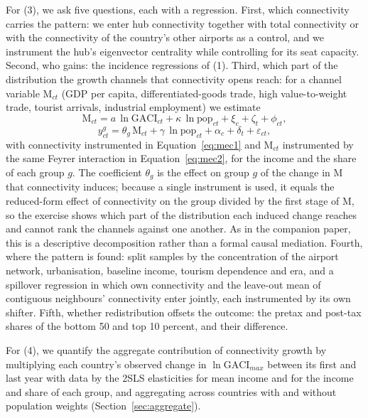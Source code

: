 For (3), we ask five questions, each with a regression. First, which connectivity carries the pattern: we enter hub connectivity together with total connectivity or with the connectivity of the country's other airports as a control, and we instrument the hub's eigenvector centrality while controlling for its seat capacity. Second, who gains: the incidence regressions of (1). Third, which part of the distribution the growth channels that connectivity opens reach: for a channel variable $\mathrm{M}_{ct}$ (GDP per capita, differentiated-goods trade, high value-to-weight trade, tourist arrivals, industrial employment) we estimate
\begin{equation}
\mathrm{M}_{ct} = a\,\ln\mathrm{GACI}_{ct} + \kappa\,\ln\text{pop}_{ct} + \xi_c + \zeta_t + \phi_{ct},
\label{eq:mec1}
\end{equation}
\begin{equation}
y^{g}_{ct} = \theta_g\,\mathrm{M}_{ct} + \gamma\,\ln\text{pop}_{ct} + \alpha_c + \delta_t + \varepsilon_{ct},
\label{eq:mec2}
\end{equation}
with connectivity instrumented in Equation~\eqref{eq:mec1} and $\mathrm{M}_{ct}$ instrumented by the same Feyrer interaction in Equation~\eqref{eq:mec2}, for the income and the share of each group $g$. The coefficient $\theta_g$ is the effect on group $g$ of the change in $\mathrm{M}$ that connectivity induces; because a single instrument is used, it equals the reduced-form effect of connectivity on the group divided by the first stage of $\mathrm{M}$, so the exercise shows which part of the distribution each induced change reaches and cannot rank the channels against one another. As in the companion paper, this is a descriptive decomposition rather than a formal causal mediation. Fourth, where the pattern is found: split samples by the concentration of the airport network, urbanisation, baseline income, tourism dependence and era, and a spillover regression in which own connectivity and the leave-out mean of contiguous neighbours' connectivity enter jointly, each instrumented by its own shifter. Fifth, whether redistribution offsets the outcome: the pretax and post-tax shares of the bottom 50 and top 10 percent, and their difference.

For (4), we quantify the aggregate contribution of connectivity growth by multiplying each country's observed change in $\ln\mathrm{GACI}_{max}$ between its first and last year with data by the 2SLS elasticities for mean income and for the income and share of each group, and aggregating across countries with and without population weights (Section~\ref{sec:aggregate}).

